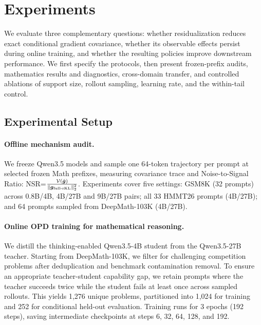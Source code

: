 \section{Experiments}
\label{sec:experiments}

We evaluate three complementary questions: whether residualization reduces
exact conditional gradient covariance, whether its observable effects
persist during online training, and whether the resulting policies improve
downstream performance. We first specify the protocols, then present
frozen-prefix audits, mathematics results and diagnostics, cross-domain
transfer, and controlled ablations of support size, rollout sampling,
learning rate, and the within-tail control.

\subsection{Experimental Setup}
\label{sec:ex-setup}

\paragraph{Offline mechanism audit.}
We freeze Qwen3.5 \citep{qwen3.5} models and sample one 64-token trajectory per prompt at selected frozen Math
prefixes, measuring covariance trace and Noise-to-Signal Ratio:
NSR=$\frac{\mathcal{V}(\hat{\bm{g}})}{\|\bm{g}_{\text{full-rKL}}\|_2^2}$.
Experiments cover five settings: GSM8K \citep{cobbe2021gsm8k} (32 prompts) across 0.8B/4B, 4B/27B and 9B/27B pairs; all 33 HMMT26 prompts \citep{dekoninck2026matharena} (4B/27B); and 64 prompts sampled from DeepMath-103K \citep{deepmath} (4B/27B).

\paragraph{Online OPD training for mathematical reasoning.}
We distill the thinking-enabled Qwen3.5-4B student from the Qwen3.5-27B teacher. Starting from DeepMath-103K, we filter for challenging competition problems after deduplication and benchmark contamination removal. To ensure an appropriate teacher-student capability gap, we retain prompts where the teacher succeeds twice while the student fails at least once across sampled rollouts. This yields 1,276 unique problems, partitioned into 1,024 for training and 252 for conditional held-out evaluation. Training runs for 3 epochs (192 steps), saving intermediate checkpoints at steps 6, 32, 64, 128, and 192.
\vspace{-4mm}

